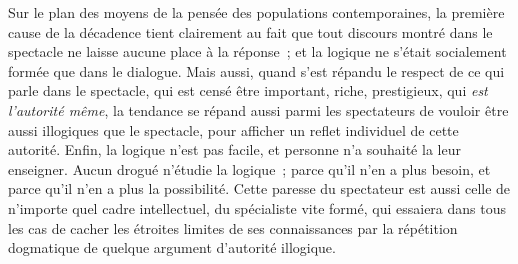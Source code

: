 \documentclass[french,twoside]{book} %
\def\bignobreak{\ifdim\lastskip<\bigskipamount
  \removelastskip\nopagebreak\bigskip\fi}
\newcommand{\labelblock}[1]{\bigbreak{\color{rubric}\noindent\textbf{#1}\par}\bignobreak}
\begin{document}
Sur le plan des moyens de la pensée des populations contemporaines, la première cause de la décadence tient clairement au fait que tout discours montré dans le spectacle ne laisse aucune place à la réponse ; et la logique ne s’était socialement formée que dans le dialogue. Mais aussi, quand s’est répandu le respect de ce qui parle dans le spectacle, qui est censé être important, riche, prestigieux, qui \emph{est l’autorité même}, la tendance se répand aussi parmi les spectateurs de vouloir être aussi illogiques que le spectacle, pour afficher un reflet individuel de cette autorité. Enfin, la logique n’est pas facile, et personne n’a souhaité la leur enseigner. Aucun drogué n’étudie la logique ; parce qu’il n’en a plus besoin, et parce qu’il n’en a plus la possibilité. Cette paresse du spectateur est aussi celle de n’importe quel cadre intellectuel, du spécialiste vite formé, qui essaiera dans tous les cas de cacher les étroites limites de ses connaissances par la répétition dogmatique de quelque argument d’autorité illogique.\par

\labelblock{XI}
\end{document}
